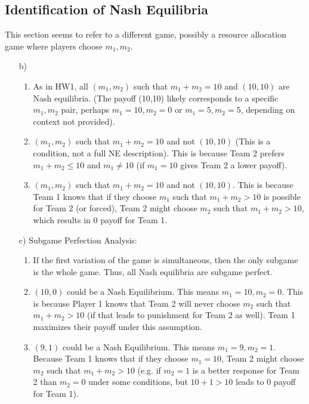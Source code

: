 \begin{solution}
\subsection*{Identification of Nash Equilibria}
This section seems to refer to a different game, possibly a resource allocation game where players choose $m_1, m_2$.
\begin{enumerate}
    \item[b)]
    \begin{enumerate}
        \item As in HW1, all $(m_1, m_2)$ such that $m_1+m_2=10$ and $(10,10)$ are Nash equilibria. (The payoff (10,10) likely corresponds to a specific $m_1, m_2$ pair, perhaps $m_1=10, m_2=0$ or $m_1=5, m_2=5$, depending on context not provided).
        \item $(m_1, m_2)$ such that $m_1+m_2=10$ and not $(10,10)$ (This is a condition, not a full NE description). This is because Team 2 prefers $m_1+m_2 \le 10$ and $m_1 \ne 10$ (if $m_1=10$ gives Team 2 a lower payoff).
        \item $(m_1, m_2)$ such that $m_1+m_2=10$ and not $(10,10)$. This is because Team 1 knows that if they choose $m_1$ such that $m_1+m_2 > 10$ is possible for Team 2 (or forced), Team 2 might choose $m_2$ such that $m_1+m_2 > 10$, which results in 0 payoff for Team 1.
    \end{enumerate}
    \item[c)] Subgame Perfection Analysis:
    \begin{enumerate}
        \item If the first variation of the game is simultaneous, then the only subgame is the whole game. Thus, all Nash equilibria are subgame perfect.
        \item $(10,0)$ could be a Nash Equilibrium. This means $m_1=10, m_2=0$. This is because Player 1 knows that Team 2 will never choose $m_2$ such that $m_1+m_2 > 10$ (if that leads to punishment for Team 2 as well). Team 1 maximizes their payoff under this assumption.
        \item $(9,1)$ could be a Nash Equilibrium. This means $m_1=9, m_2=1$. Because Team 1 knows that if they choose $m_1=10$, Team 2 might choose $m_2$ such that $m_1+m_2 > 10$ (e.g. if $m_2=1$ is a better response for Team 2 than $m_2=0$ under some conditions, but $10+1>10$ leads to 0 payoff for Team 1).
    \end{enumerate}
\end{enumerate}
\end{solution}

